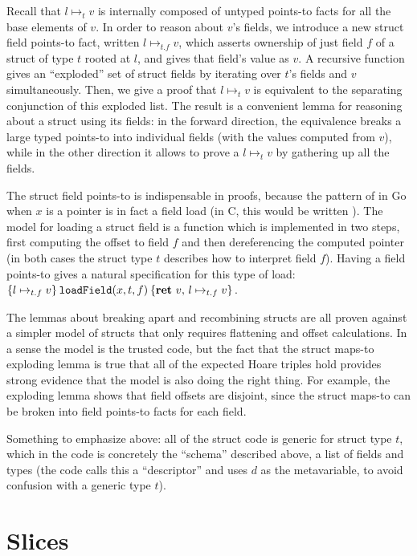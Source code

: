 Recall that $l \mapsto_t v$ is internally composed of untyped
points-to facts for all the base elements of $v$. In order to reason
about $v$'s fields, we introduce a new struct field points-to fact,
written $l \mapsto_{t.f} v$, which asserts ownership of just field
$f$ of a struct of type $t$ rooted at $l$, and gives that field's
value as $v$. A recursive function gives an ``exploded'' set of struct
fields by iterating over $t$'s fields and $v$ simultaneously. Then,
we give a proof that $l \mapsto_t v$ is equivalent to the separating
conjunction of this exploded list. The result is a convenient lemma for
reasoning about a struct using its fields: in the forward direction, the
equivalence breaks a large typed points-to into individual fields (with
the values computed from $v$), while in the other direction it allows
to prove a $l \mapsto_t v$ by gathering up all the fields.

The struct field points-to is indispensable in proofs, because the
pattern of  in Go when $x$ is a pointer is in fact a field
load (in C, this would be written ). The model
for loading a struct field is a function 
which is implemented in two steps, first computing the offset to field
$f$ and then dereferencing the computed pointer (in both cases the struct type $t$
describes how to interpret field $f$). Having a field points-to gives
a natural specification for this type of load:
$\hoare{l \mapsto_{t.f} v}{\mathtt{loadField}(x, t, f)}{\Ret{v} l \mapsto_{t.f} v}$.

The lemmas about breaking apart and recombining structs are all proven
against a simpler model of structs that only requires flattening and
offset calculations. In a sense the model is the trusted code, but the
fact that the struct maps-to exploding lemma is true that all of the
expected Hoare triples hold provides strong evidence that the model is
also doing the right thing. For example, the exploding lemma shows that
field offsets are disjoint, since the struct maps-to can be broken into
field points-to facts for each field.

Something to emphasize above: all of the struct code is generic for
struct type $t$, which in the code is concretely the ``schema''
described above, a list of fields and types (the code calls this a
``descriptor'' and uses $d$ as the metavariable, to avoid confusion
with a generic type $t$).

\section{Slices}


